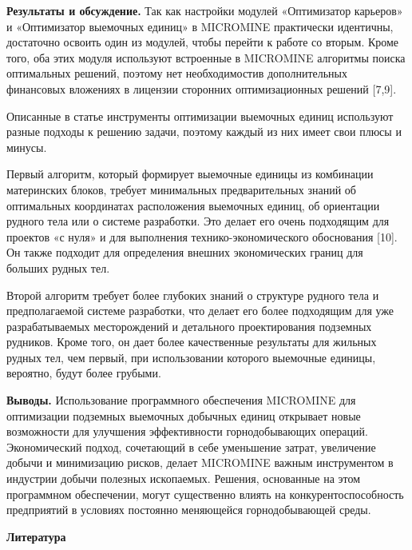 \begin{multicols}{2}
{\bfseries Результаты и обсуждение.} Так как настройки модулей «Оптимизатор
карьеров» и «Оптимизатор выемочных единиц» в MICROMINE практически
идентичны, достаточно освоить один из модулей, чтобы перейти к работе со
вторым. Кроме того, оба этих модуля используют встроенные в MICROMINE
алгоритмы поиска оптимальных решений, поэтому нет необходимостив
дополнительных финансовых вложениях в лицензии сторонних оптимизационных
решений {[}7,9{]}.

Описанные в статье инструменты оптимизации выемочных единиц используют
разные подходы к решению задачи, поэтому каждый из них имеет свои плюсы
и минусы.

Первый алгоритм, который формирует выемочные единицы из комбинации
материнских блоков, требует минимальных предварительных знаний об
оптимальных координатах расположения выемочных единиц, об ориентации
рудного тела или о системе разработки. Это делает его очень подходящим
для проектов «с нуля» и для выполнения технико-экономического
обоснования {[}10{]}. Он также подходит для определения внешних
экономических границ для больших рудных тел.

Второй алгоритм требует более глубоких знаний о структуре рудного тела и
предполагаемой системе разработки, что делает его более подходящим для
уже разрабатываемых месторождений и детального проектирования подземных
рудников. Кроме того, он дает более качественные результаты для жильных
рудных тел, чем первый, при использовании которого выемочные единицы,
вероятно, будут более грубыми.

{\bfseries Выводы.} Использование программного обеспечения MICROMINE для
оптимизации подземных выемочных добычных единиц открывает новые
возможности для улучшения эффективности горнодобывающих операций.
Экономический подход, сочетающий в себе уменьшение затрат, увеличение
добычи и минимизацию рисков, делает MICROMINE важным инструментом в
индустрии добычи полезных ископаемых. Решения, основанные на этом
программном обеспечении, могут существенно влиять на
конкурентоспособность предприятий в условиях постоянно меняющейся
горнодобывающей среды.
\end{multicols}

\begin{center}
{\bfseries Литература}
\end{center}

